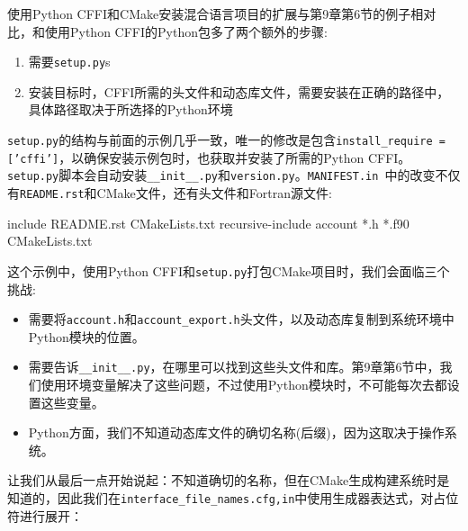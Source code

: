 
使用Python CFFI和CMake安装混合语言项目的扩展与第9章第6节的例子相对比，和使用Python CFFI的Python包多了两个额外的步骤:

\begin{enumerate}
\item 需要\texttt{setup.py}s

\item 安装目标时，CFFI所需的头文件和动态库文件，需要安装在正确的路径中，具体路径取决于所选择的Python环境

\end{enumerate}

\texttt{setup.py}的结构与前面的示例几乎一致，唯一的修改是包含\texttt{install\_require =['cffi']}，以确保安装示例包时，也获取并安装了所需的Python CFFI。\texttt{setup.py}脚本会自动安装\texttt{\_\_init\_\_.py}和\texttt{version.py}。\texttt{MANIFEST.in }中的改变不仅有\texttt{README.rst}和CMake文件，还有头文件和Fortran源文件:

\begin{codebox}[text]
include README.rst CMakeLists.txt
recursive-include account *.h *.f90 CMakeLists.txt
\end{codebox}

这个示例中，使用Python CFFI和\texttt{setup.py}打包CMake项目时，我们会面临三个挑战:

\begin{itemize}
\item 需要将\texttt{account.h}和\texttt{account\_export.h}头文件，以及动态库复制到系统环境中Python模块的位置。

\item 需要告诉\texttt{\_\_init\_\_.py}，在哪里可以找到这些头文件和库。第9章第6节中，我们使用环境变量解决了这些问题，不过使用Python模块时，不可能每次去都设置这些变量。

\item Python方面，我们不知道动态库文件的确切名称(后缀)，因为这取决于操作系统。

\end{itemize}

让我们从最后一点开始说起：不知道确切的名称，但在CMake生成构建系统时是知道的，因此我们在\texttt{interface\_file\_names.cfg,in}中使用生成器表达式，对占位符进行展开：


